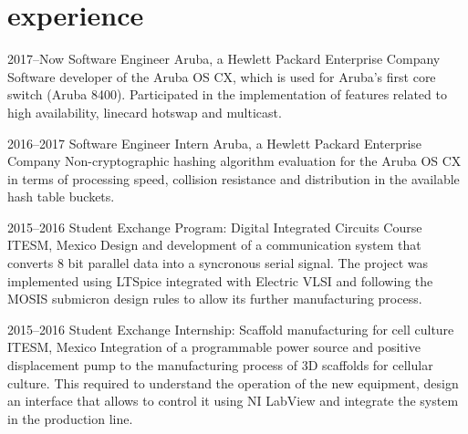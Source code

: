 \documentclass[]{friggeri-cv} %
\begin{document}

\section{experience}


\begin{entrylist}


\entry
{2017--Now}
{Software Engineer}
{Aruba, a Hewlett Packard Enterprise Company}
{Software developer of the Aruba OS CX, which is used for Aruba's first core switch (Aruba 8400). Participated in the implementation of features related to high availability, linecard hotswap and multicast.} 

\entry
{2016--2017}
{Software Engineer Intern}
{Aruba, a Hewlett Packard Enterprise Company}
{Non-cryptographic hashing algorithm evaluation for the Aruba OS CX
in terms of processing speed, collision resistance and distribution in the available hash table buckets.} 

\entry
{2015--2016}
{Student Exchange Program: Digital Integrated Circuits Course}
{ITESM, Mexico}
{Design and development of a communication system that converts 8 bit parallel data into a syncronous serial signal. The project was implemented using LTSpice integrated with Electric VLSI and following the MOSIS submicron design rules to allow its further manufacturing process.} 

\entry
{2015--2016}
{Student Exchange Internship: Scaffold manufacturing for cell culture}
{ITESM, Mexico}
{Integration of a programmable power source and positive displacement pump to the manufacturing process of 3D scaffolds for cellular culture. This required to understand the operation of the new equipment, design an interface that allows to control it using NI LabView and integrate the system in the production line.} 


\end{entrylist}
\end{document}
